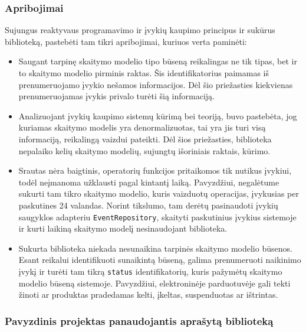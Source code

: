 \subsubsection{Apribojimai}

Sujungus reaktyvaus programavimo ir įvykių kaupimo principus ir sukūrus biblioteką, pastebėti tam tikri apribojimai, kuriuos verta paminėti:

\begin{itemize}
  \item Saugant tarpinę skaitymo modelio tipo būseną reikalingas ne tik tipas, bet ir to skaitymo modelio pirminis raktas. Šis identifikatorius paimamas iš prenumeruojamo įvykio nešamos informacijos. Dėl šio priežasties kiekvienas prenumeruojamas įvykis privalo turėti šią informaciją.
  \item Analizuojant įvykių kaupimo sistemų kūrimą bei teoriją, buvo pastebėta, jog kuriamas skaitymo modelis yra denormalizuotas, tai yra jis turi visą informaciją, reikalingą vaizdui pateikti. Dėl šios priežasties, biblioteka nepalaiko kelių skaitymo modelių, sujungtų išoriniais raktais, kūrimo.
  \item Srautas nėra baigtinis, operatorių funkcijos pritaikomos tik nutikus įvykiui, todėl neįmanoma užklausti pagal kintantį laiką. Pavyzdžiui, negalėtume sukurti tam tikro skaitymo modelio, kuris vaizduotų operacijas, įvykusias per paskutines 24 valandas. Norint tikslumo, tam derėtų pasinaudoti įvykių saugyklos adapteriu \lstinline|EventRepository|, skaityti paskutinius įvykius sistemoje ir kurti laikiną skaitymo modelį nesinaudojant biblioteka.
  \item Sukurta biblioteka niekada nesunaikina tarpinės skaitymo modelio būsenos. Esant reikalui identifikuoti sunaikintą būseną, galima prenumeruoti naikinimo įvykį ir turėti tam tikrą \lstinline|status| identifikatorių, kuris pažymėtų skaitymo modelio būseną sistemoje. Pavyzdžiui, elektroninėje parduotuvėje gali tekti žinoti ar produktas pradedamas kelti, įkeltas, suspenduotas ar ištrintas.
\end{itemize}

\subsubsection{Pavyzdinis projektas panaudojantis aprašytą biblioteką}


